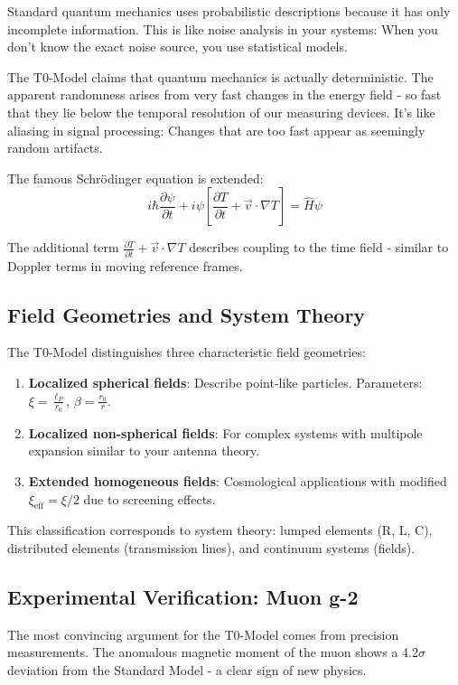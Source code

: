 \documentclass[12pt,a4paper]{article}
\begin{document}
Standard quantum mechanics uses probabilistic descriptions because it has only incomplete information. This is like noise analysis in your systems: When you don't know the exact noise source, you use statistical models.

The T0-Model claims that quantum mechanics is actually deterministic. The apparent randomness arises from very fast changes in the energy field - so fast that they lie below the temporal resolution of our measuring devices. It's like aliasing in signal processing: Changes that are too fast appear as seemingly random artifacts.

The famous Schrödinger equation is extended:
$$i\hbar\frac{\partial\psi}{\partial t} + i\psi\left[\frac{\partial T}{\partial t} + \vec{v} \cdot \nabla T\right] = \hat{H}\psi$$

The additional term $\frac{\partial T}{\partial t} + \vec{v} \cdot \nabla T$ describes coupling to the time field - similar to Doppler terms in moving reference frames.

\subsection{Field Geometries and System Theory}

The T0-Model distinguishes three characteristic field geometries:

\begin{enumerate}
	\item \textbf{Localized spherical fields}: Describe point-like particles. Parameters: $\xi = \frac{\ell_P}{r_0}$, $\beta = \frac{r_0}{r}$.
	\item \textbf{Localized non-spherical fields}: For complex systems with multipole expansion similar to your antenna theory.
	\item \textbf{Extended homogeneous fields}: Cosmological applications with modified $\xi_{\text{eff}} = \xi/2$ due to screening effects.
\end{enumerate}

This classification corresponds to system theory: lumped elements (R, L, C), distributed elements (transmission lines), and continuum systems (fields).

\subsection{Experimental Verification: Muon g-2}

The most convincing argument for the T0-Model comes from precision measurements. The anomalous magnetic moment of the muon shows a 4.2$\sigma$ deviation from the Standard Model - a clear sign of new physics.
\end{document}
